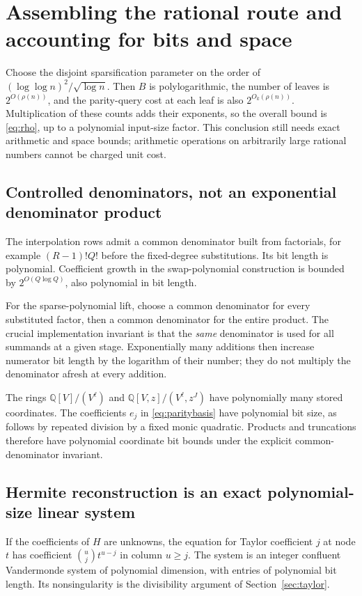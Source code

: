 \documentclass[11pt,a4paper]{article}
\numberwithin{equation}{section}
\theoremstyle{definition}
\theoremstyle{remark}
\newcommand{\Q}{\mathbb Q}
\begin{document}
\section{Assembling the rational route and accounting for bits and space}
\label{sec:arithmetic}
Choose the disjoint sparsification parameter on the order of
$(\log\log n)^2/\sqrt{\log n}$. Then $B$ is polylogarithmic, the number of
leaves is $2^{O(\rho(n))}$, and the parity-query cost at each leaf is also
$2^{O_k(\rho(n))}$. Multiplication of these counts adds their exponents, so
the overall bound is \eqref{eq:rho}, up to a polynomial input-size factor.
This conclusion still needs exact arithmetic and space bounds; arithmetic
operations on arbitrarily large rational numbers cannot be charged unit cost.

\subsection{Controlled denominators, not an exponential denominator product}
The interpolation rows admit a common denominator built from factorials,
for example $(R-1)!Q!$ before the fixed-degree substitutions. Its bit length
is polynomial. Coefficient growth in the swap-polynomial construction is
bounded by $2^{O(Q\log Q)}$, also polynomial in bit length.

For the sparse-polynomial lift, choose a common denominator for every
substituted factor, then a common denominator for the entire product.
The crucial implementation invariant is that the \emph{same} denominator is
used for all summands at a given stage. Exponentially many additions then
increase numerator bit length by the logarithm of their number; they do not
multiply the denominator afresh at every addition.

The rings $\Q[V]/(V^\ell)$ and
$\Q[V,z]/(V^\ell,z^J)$ have polynomially many stored coordinates.
The coefficients $e_j$ in \eqref{eq:paritybasis} have polynomial bit size,
as follows by repeated division by a fixed monic quadratic. Products and
truncations therefore have polynomial coordinate bit bounds under the
explicit common-denominator invariant.

\subsection{Hermite reconstruction is an exact polynomial-size linear system}
If the coefficients of $H$ are unknowns, the equation for Taylor coefficient
$j$ at node $t$ has coefficient $\binom uj t^{u-j}$ in column $u\ge j$.
The system is an integer confluent Vandermonde system of polynomial dimension,
with entries of polynomial bit length. Its nonsingularity is the divisibility
argument of Section~\ref{sec:taylor}.
\end{document}

